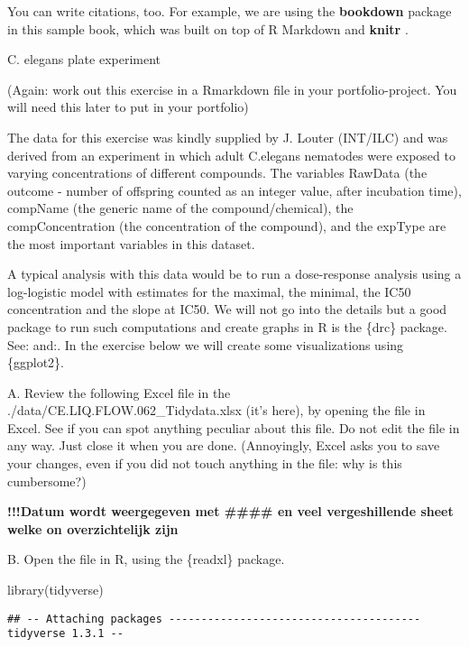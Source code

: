 \documentclass[
]{book}
\newenvironment{Shaded}{\begin{snugshade}}{\end{snugshade}}
\newcommand{\FunctionTok}[1]{\textcolor[rgb]{0.00,0.00,0.00}{#1}}
\newcommand{\NormalTok}[1]{#1}
\begin{document}
You can write citations, too. For example, we are using the \textbf{bookdown} package \citep{R-bookdown} in this sample book, which was built on top of R Markdown and \textbf{knitr} \citep{xie2015}.

C. elegans plate experiment

(Again: work out this exercise in a Rmarkdown file in your portfolio-project. You will need this later to put in your portfolio)

The data for this exercise was kindly supplied by J. Louter (INT/ILC) and was derived from an experiment in which adult C.elegans nematodes were exposed to varying concentrations of different compounds. The variables RawData (the outcome - number of offspring counted as an integer value, after incubation time), compName (the generic name of the compound/chemical), the compConcentration (the concentration of the compound), and the expType are the most important variables in this dataset.

A typical analysis with this data would be to run a dose-response analysis using a log-logistic model with estimates for the maximal, the minimal, the IC50 concentration and the slope at IC50. We will not go into the details but a good package to run such computations and create graphs in R is the \{drc\} package. See: and:. In the exercise below we will create some visualizations using \{ggplot2\}.

A. Review the following Excel file in the ./data/CE.LIQ.FLOW.062\_Tidydata.xlsx (it's here), by opening the file in Excel. See if you can spot anything peculiar about this file. Do not edit the file in any way. Just close it when you are done. (Annoyingly, Excel asks you to save your changes, even if you did not touch anything in the file: why is this cumbersome?)

\textbf{!!!Datum wordt weergegeven met \#\#\#\# en veel vergeshillende sheet welke on overzichtelijk zijn}

B. Open the file in R, using the \{readxl\} package.

\begin{Shaded}
\begin{Highlighting}[]
\FunctionTok{library}\NormalTok{(tidyverse)}
\end{Highlighting}
\end{Shaded}

\begin{verbatim}
## -- Attaching packages --------------------------------------- tidyverse 1.3.1 --
\end{verbatim}
\end{document}
